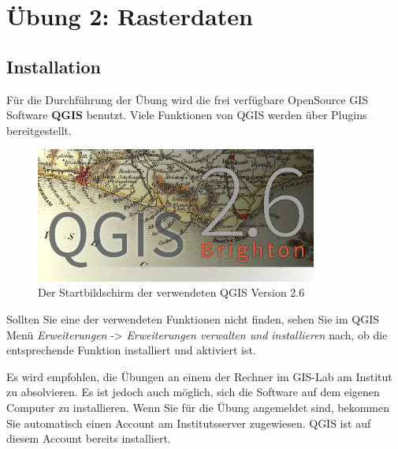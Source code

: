\documentclass[a4paper,12pt,ngerman]{sphinxmanual}
\begin{document}
\chapter{Übung 2: Rasterdaten}
\label{uebung2::doc}\label{uebung2:ubung-2-rasterdaten}

\section{Installation}
\label{uebung2:installation}
Für die Durchführung der Übung wird die frei verfügbare OpenSource GIS Software \textbf{QGIS} benutzt. Viele Funktionen von QGIS werden über Plugins bereitgestellt.
\begin{figure}[htbp]
\centering
\capstart

\includegraphics[width=25em]{qgis-splash.png}
\caption{Der Startbildschirm der verwendeten QGIS Version 2.6}\label{uebung2:figqgissplash}\end{figure}

Sollten Sie eine der verwendeten Funktionen nicht finden, sehen Sie im QGIS Menü \emph{Erweiterungen} -\textgreater{} \emph{Erweiterungen verwalten und installieren} nach, ob die entsprechende Funktion installiert und aktiviert ist.

Es wird empfohlen, die Übungen an einem der Rechner im GIS-Lab am Institut zu absolvieren. Es ist jedoch auch möglich, sich die Software auf dem eigenen Computer zu installieren.
Wenn Sie für die Übung angemeldet sind, bekommen Sie automatisch einen Account am Institutsserver zugewiesen. QGIS ist auf diesem Account bereits installiert.
\end{document}
